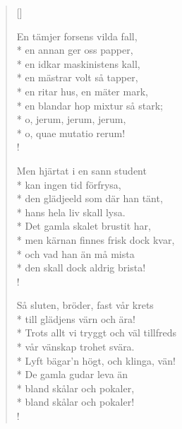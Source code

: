 \begin{verse}[\versewidth]

En tämjer forsens vilda fall,\\*
en annan ger oss papper,\\*
en idkar maskinistens kall,\\*
en mästrar volt så tapper,\\*
en ritar hus, en mäter mark,\\*
en blandar hop mixtur så stark;\\*
o, jerum, jerum, jerum,\\*
o, quae mutatio rerum!\\!


Men hjärtat i en sann student\\*
kan ingen tid förfrysa,\\*
den glädjeeld som där han tänt,\\*
hans hela liv skall lysa.\\*
Det gamla skalet brustit har,\\*
men kärnan finnes frisk dock kvar,\\*
och vad han än må mista\\*
den skall dock aldrig brista!\\!


Så sluten, bröder, fast vår krets\\*
till glädjens värn och ära!\\*
Trots allt vi tryggt och väl tillfreds\\*
vår vänskap trohet svära.\\*
Lyft bägar'n högt, och klinga, vän!\\*
De gamla gudar leva än\\*
bland skålar och pokaler,\\*
bland skålar och pokaler!\\!




\end{verse}

